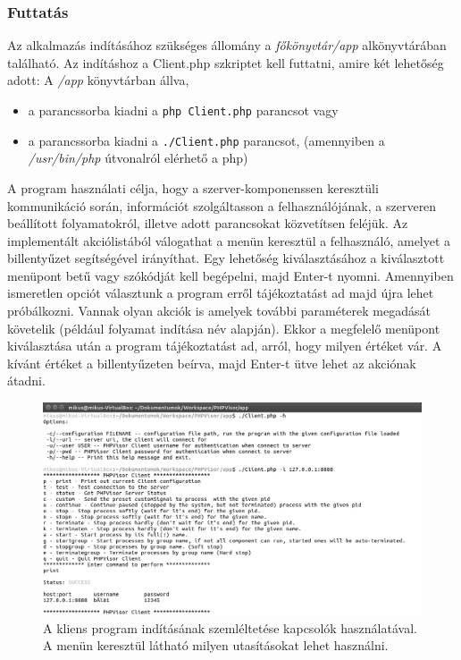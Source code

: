 \documentclass[12pt]{report}
\begin{document}
  \subsubsection{Futtatás}
  Az alkalmazás indításához szükséges állomány a \textit{főkönyvtár/app} alkönyvtárában található. Az indításhoz a  Client.php szkriptet kell futtatni, amire két lehetőség adott: A \textit{/app} könyvtárban állva,
  \begin{itemize}
  \item a parancssorba kiadni a \verb|php Client.php| parancsot vagy
  \item a parancssorba kiadni a \verb|./Client.php| parancsot, (amennyiben a \textit{/usr/bin/php} útvonalról elérhető a php)
  \end{itemize}
  A program használati célja, hogy a szerver-komponenssen keresztüli kommunikáció során, információt szolgáltasson a felhasználójának, a szerveren beállított folyamatokról, illetve adott parancsokat közvetítsen feléjük. Az implementált akciólistából válogathat a menün keresztül a felhasználó, amelyet a billentyűzet segítségével irányíthat. Egy lehetőség kiválasztásához a kiválasztott menüpont betű vagy szókódját kell begépelni, majd Enter-t nyomni. Amennyiben ismeretlen opciót választunk a program erről tájékoztatást ad majd újra lehet próbálkozni. Vannak olyan akciók is amelyek további paraméterek megadását követelik (például folyamat indítása név alapján). Ekkor a megfelelő menüpont kiválasztása után a program tájékoztatást ad, arról, hogy milyen értéket vár. A kívánt értéket a billentyűzeten beírva, majd Enter-t ütve lehet az akciónak átadni.
  
    \begin{figure}[ht]
  \centering
  \includegraphics[width=14cm]{pics/cli_h_conf.png}
	  \caption{A kliens program indításának szemléltetése  kapcsolók használatával. A menün keresztül látható milyen utasításokat lehet használni. \newline}
      \label{fig:cliconf}
  \end{figure}
  
\end{document}
